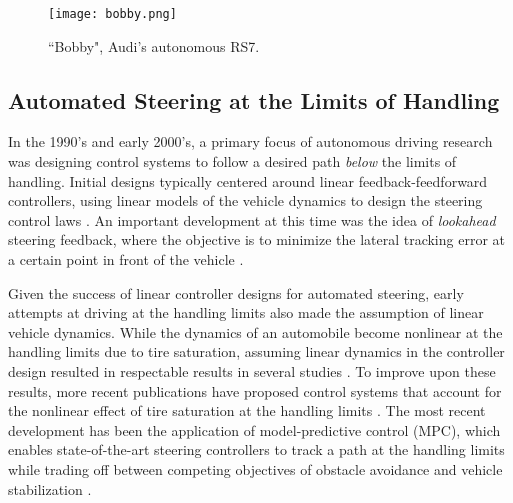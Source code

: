  \begin{figure}
\centering
\texttt{[image: bobby.png]}
\caption[Audi's autonomous RS7]{``Bobby", Audi's autonomous RS7.}
\label{fig:bobby}
\end{figure}
 
\subsection{Automated Steering at the Limits of Handling}
\label{pw1}

In the 1990's and early 2000's, a primary focus of autonomous driving research was
designing control systems to follow a desired path \textit{below} the limits of handling. Initial designs typically centered
around linear feedback-feedforward controllers, using linear models of the vehicle dynamics to design the steering control laws \cite{shladover}. An
important development at this time was the idea of \textit{lookahead} steering feedback, where the objective is to 
minimize the lateral tracking error at a certain point in front of the vehicle \cite{guldner}\cite{hingwe}\cite{rosseter}. 

Given the success of linear controller designs for automated steering, early 
attempts at driving at the handling limits also made the assumption of linear vehicle dynamics. While the dynamics of an 
automobile become nonlinear at the handling limits due to tire saturation, assuming linear dynamics in the controller design 
resulted in respectable results in several studies \cite{bessyboy}\cite{sharpysharp}\cite{tommyboy}. To improve upon these results, 
more recent publications have proposed control systems that account for the nonlinear effect of tire saturation at the handling limits
\cite{filho14}\cite{mickcop}\cite{yang14}. The most recent development has been the application of model-predictive control (MPC), which enables
state-of-the-art steering controllers to track a path at the handling limits while trading off between competing objectives of obstacle avoidance and vehicle stabilization \cite{carvalho13}\cite{joethesis}.


